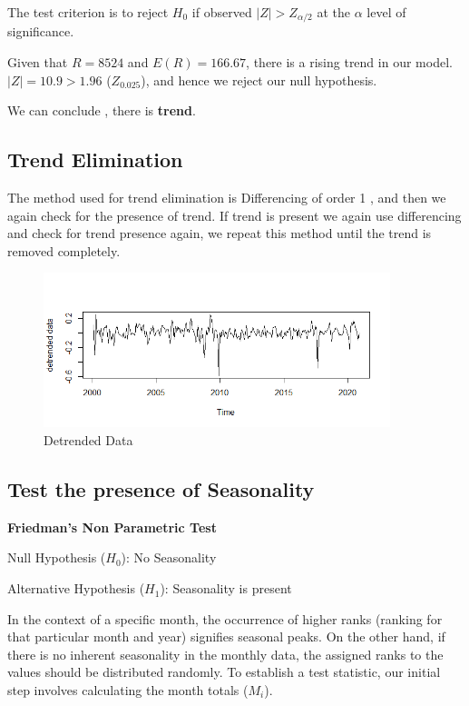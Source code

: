 \documentclass{article}
\begin{document}
The test criterion is to reject \(H_0\) if observed \(|Z| > Z_{\alpha/2}\) at the \(\alpha\) level of significance.

Given that \(R = 8524 \) and \(E(R) = 166.67\), there is a rising trend in our model. \(|Z| = 10.9> 1.96\) (\(Z_{0.025}\)), and hence we reject our null hypothesis.

We can conclude , there is \textbf{trend}.




\subsection{Trend Elimination}

The method used for trend elimination is Differencing of order 1 , and then we again check for the presence of trend. If trend is present we again use differencing and check for trend presence again, we repeat this method until the trend is removed completely.

\begin{figure}[h]
    \centering
    \includegraphics[width=0.9\textwidth]{Detrended_Data.png}
    \caption{Detrended Data}
    \label{fig:Label4}
\end{figure}

\newpage
\subsection{Test the presence of Seasonality }
\textbf{Friedman's Non Parametric Test }

\begin{center}
    Null Hypothesis (\(H_0\)): No Seasonality
    
    Alternative Hypothesis (\(H_1\)): Seasonality is present
\end{center}

In the context of a specific month, the occurrence of higher ranks (ranking for that particular month and year) signifies seasonal peaks. On the other hand, if there is no inherent seasonality in the monthly data, the assigned ranks to the values should be distributed randomly. To establish a test statistic, our initial step involves calculating the month totals (\(M_i\)).
\end{document}
